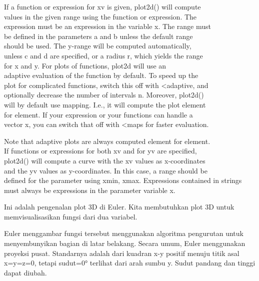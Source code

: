\documentclass[a4paper,10pt]{article}
\begin{document}
\begin{eulernotebook}
\begin{eulercomment}
\begin{eulercomment}
\begin{eulercomment}
\begin{eulercomment}
\begin{eulercomment}
\begin{eulercomment}
\begin{eulercomment}
\begin{eulercomment}
\begin{eulercomment}
If a function or expression for xv is given, plot2d() will compute\\
values in the given range using the function or expression. The\\
expression must be an expression in the variable x. The range must\\
be defined in the parameters a and b unless the default range\\
[-2,2] should be used. The y-range will be computed automatically,\\
unless c and d are specified, or a radius r, which yields the range\\
[-r,r] for x and y. For plots of functions, plot2d will use an\\
adaptive evaluation of the function by default. To speed up the\\
plot for complicated functions, switch this off with \textless{}adaptive, and\\
optionally decrease the number of intervals n. Moreover, plot2d()\\
will by default use mapping. I.e., it will compute the plot element\\
for element. If your expression or your functions can handle a\\
vector x, you can switch that off with \textless{}maps for faster evaluation.

Note that adaptive plots are always computed element for element.\\
If functions or expressions for both xv and for yv are specified,\\
plot2d() will compute a curve with the xv values as x-coordinates\\
and the yv values as y-coordinates. In this case, a range should be\\
defined for the parameter using xmin, xmax. Expressions contained in
strings must always be expressions in the parameter variable x.
\end{eulercomment}
\begin{eulercomment}

\begin{eulercomment}
\begin{eulercomment}
Ini adalah pengenalan plot 3D di Euler. Kita membutuhkan plot 3D untuk
memvisualisasikan fungsi dari dua variabel.

Euler menggambar fungsi tersebut menggunakan algoritma pengurutan
untuk menyembunyikan bagian di latar belakang. Secara umum, Euler
menggunakan proyeksi pusat. Standarnya adalah dari kuadran x-y positif
menuju titik asal x=y=z=0, tetapi sudut=0° terlihat dari arah sumbu y.
Sudut pandang dan tinggi dapat diubah.


\end{eulercomment}
\end{eulercomment}
\end{eulercomment}
\end{eulercomment}
\end{eulercomment}
\end{eulercomment}
\end{eulercomment}
\end{eulercomment}
\end{eulercomment}
\end{eulercomment}
\end{eulercomment}
\end{eulernotebook}
\end{document}
